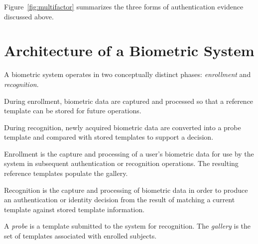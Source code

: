 \documentclass[11pt,a4paper,oneside]{report}
\begin{document}
Figure~\ref{fig:multifactor} summarizes the three forms of authentication
evidence discussed above.

\section{Architecture of a Biometric System}
\label{subsec:architecture}

A biometric system operates in two conceptually distinct phases:
\emph{enrollment} and \emph{recognition}.

During enrollment, biometric data are captured and processed so that a
reference template can be stored for future operations.

During recognition, newly acquired biometric data are converted into a
probe template and compared with stored templates to support a decision.

\begin{definitionbox}[ -- Enrollment]
Enrollment is the capture and processing of a user's biometric data for
use by the system in subsequent authentication or recognition operations.
The resulting reference templates populate the gallery.
\end{definitionbox}

\begin{definitionbox}[ -- Recognition]
Recognition is the capture and processing of biometric data in order to
produce an authentication or identity decision from the result of matching
a current template against stored template information.
\end{definitionbox}

\begin{definitionbox}
A \emph{probe} is a template submitted to the system for recognition.
The \emph{gallery} is the set of templates associated with enrolled
subjects.
\end{definitionbox}
\end{document}
